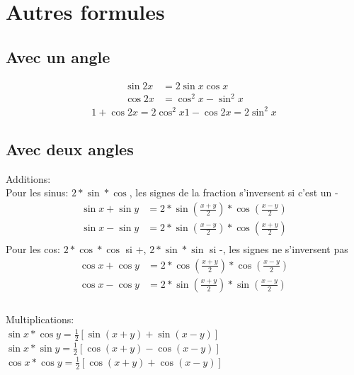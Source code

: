 \documentclass[12pt]{article}
\begin{document}
\section{Autres formules}
\subsection{Avec un angle}
\begin{align*}
  \sin 2x &= 2\sin x\cos x\\
  \cos 2x &= \cos^2 x - \sin^2 x
\end{align*}
\begin{align*}
  1 + \cos 2x = 2 \cos^2 x
  1 - \cos 2x = 2 \sin^2 x
\end{align*}

\subsection{Avec deux angles}
Additions:\\
Pour les sinus: $2*\sin*\cos$, les signes de la fraction s'inversent si c'est un -
\begin{align*}
  \sin x + \sin y &= 2 *\sin(\frac{x+y}{2}) * \cos(\frac{x-y}{2})\\
  \sin x - \sin y &= 2 *\sin(\frac{x-y}{2}) * \cos(\frac{x+y}{2})\\
\end{align*}
Pour les cos: $2*\cos*\cos$ si +, $2*\sin*\sin$ si -, les signes ne s'inversent pas
\begin{align*}
  \cos x + \cos y &= 2 *\cos(\frac{x+y}{2}) * \cos(\frac{x-y}{2})\\
  \cos x - \cos y &= 2 *\sin(\frac{x+y}{2}) * \sin(\frac{x-y}{2})\\
\end{align*}
\\
Multiplications:\\
$\sin x*\cos y = \frac{1}{2}[\sin(x+y) + \sin(x - y)]$
$\sin x*\sin y = \frac{1}{2}[\cos(x+y) - \cos(x - y)]$
$\cos x*\cos y= \frac{1}{2}[\cos(x+y) + \cos(x - y)]$
  
  
\end{document}

